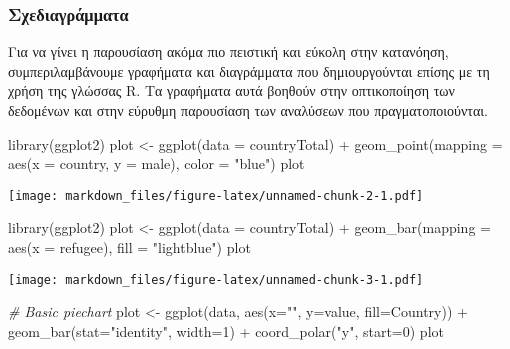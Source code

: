 \documentclass[
]{article}
\newenvironment{Shaded}{\begin{snugshade}}{\end{snugshade}}
\newcommand{\AttributeTok}[1]{\textcolor[rgb]{0.77,0.63,0.00}{#1}}
\newcommand{\CommentTok}[1]{\textcolor[rgb]{0.56,0.35,0.01}{\textit{#1}}}
\newcommand{\DecValTok}[1]{\textcolor[rgb]{0.00,0.00,0.81}{#1}}
\newcommand{\FunctionTok}[1]{\textcolor[rgb]{0.00,0.00,0.00}{#1}}
\newcommand{\NormalTok}[1]{#1}
\newcommand{\OtherTok}[1]{\textcolor[rgb]{0.56,0.35,0.01}{#1}}
\newcommand{\SpecialCharTok}[1]{\textcolor[rgb]{0.00,0.00,0.00}{#1}}
\newcommand{\StringTok}[1]{\textcolor[rgb]{0.31,0.60,0.02}{#1}}
\begin{document}
\hypertarget{ux3c3ux3c7ux3b5ux3b4ux3b9ux3b1ux3b3ux3c1ux3acux3bcux3bcux3b1ux3c4ux3b1}{%
\subsubsection{Σχεδιαγράμματα}\label{ux3c3ux3c7ux3b5ux3b4ux3b9ux3b1ux3b3ux3c1ux3acux3bcux3bcux3b1ux3c4ux3b1}}

Για να γίνει η παρουσίαση ακόμα πιο πειστική και εύκολη στην κατανόηση,
συμπεριλαμβάνουμε γραφήματα και διαγράμματα που δημιουργούνται επίσης με
τη χρήση της γλώσσας R. Τα γραφήματα αυτά βοηθούν στην οπτικοποίηση των
δεδομένων και στην εύρυθμη παρουσίαση των αναλύσεων που
πραγματοποιούνται.

\begin{Shaded}
\begin{Highlighting}[]
\FunctionTok{library}\NormalTok{(ggplot2)}
\NormalTok{plot }\OtherTok{\textless{}{-}} \FunctionTok{ggplot}\NormalTok{(}\AttributeTok{data =}\NormalTok{ countryTotal) }\SpecialCharTok{+} 
  \FunctionTok{geom\_point}\NormalTok{(}\AttributeTok{mapping =} \FunctionTok{aes}\NormalTok{(}\AttributeTok{x =}\NormalTok{ country, }\AttributeTok{y =}\NormalTok{ male), }\AttributeTok{color =} \StringTok{"blue"}\NormalTok{)}
\NormalTok{plot}
\end{Highlighting}
\end{Shaded}

\texttt{[image: markdown\_files/figure-latex/unnamed-chunk-2-1.pdf]}

\begin{Shaded}
\begin{Highlighting}[]
\FunctionTok{library}\NormalTok{(ggplot2)}
\NormalTok{plot }\OtherTok{\textless{}{-}} \FunctionTok{ggplot}\NormalTok{(}\AttributeTok{data =}\NormalTok{ countryTotal) }\SpecialCharTok{+} 
  \FunctionTok{geom\_bar}\NormalTok{(}\AttributeTok{mapping =} \FunctionTok{aes}\NormalTok{(}\AttributeTok{x =}\NormalTok{ refugee), }\AttributeTok{fill =} \StringTok{"lightblue"}\NormalTok{)}
\NormalTok{plot}
\end{Highlighting}
\end{Shaded}

\texttt{[image: markdown\_files/figure-latex/unnamed-chunk-3-1.pdf]}

\begin{Shaded}
\begin{Highlighting}[]
\CommentTok{\# Basic piechart}
\NormalTok{plot }\OtherTok{\textless{}{-}} \FunctionTok{ggplot}\NormalTok{(data, }\FunctionTok{aes}\NormalTok{(}\AttributeTok{x=}\StringTok{""}\NormalTok{, }\AttributeTok{y=}\NormalTok{value, }\AttributeTok{fill=}\NormalTok{Country)) }\SpecialCharTok{+}
  \FunctionTok{geom\_bar}\NormalTok{(}\AttributeTok{stat=}\StringTok{"identity"}\NormalTok{, }\AttributeTok{width=}\DecValTok{1}\NormalTok{) }\SpecialCharTok{+}
  \FunctionTok{coord\_polar}\NormalTok{(}\StringTok{"y"}\NormalTok{, }\AttributeTok{start=}\DecValTok{0}\NormalTok{)}
\NormalTok{plot}
\end{Highlighting}
\end{Shaded}
\end{document}
